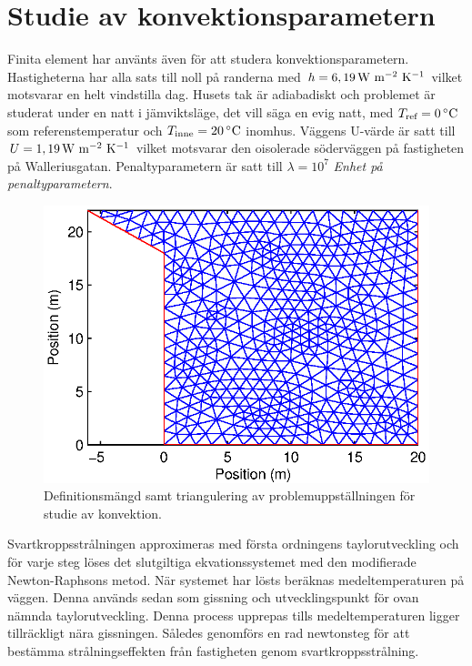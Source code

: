 \section{Studie av konvektionsparametern}

Finita element har använts även för att studera konvektionsparametern. Hastigheterna har alla
sats till noll på randerna med $h=\unit[6,19]{W~m^{-2}~K^{-1}}$ vilket motsvarar en helt vindstilla dag.
Husets tak är adiabadiskt
och problemet är studerat under en natt i jämviktsläge, det vill säga en evig natt, med
$T_\text{ref} = \unit[0]{^\circ C}$ som referenstemperatur och $T_\text{inne} = \unit[20]{^\circ C}$ inomhus.
Väggens U-värde är satt till $U = \unit[1,19]{W~m^{-2}~K^{-1}}$ vilket motsvarar den oisolerade söderväggen på fastigheten på Walleriusgatan. Penaltyparametern är satt till $\lambda = 10^7$ \emph{\color{red}Enhet på penaltyparametern}.

\begin{figure}
\centering
\includegraphics{images/triconvec.eps}
\caption{Definitionsmängd samt triangulering av problemuppställningen för studie av konvektion.}
\end{figure}

Svartkroppsstrålningen approximeras med första ordningens taylorutveckling och
för varje steg löses det slutgiltiga ekvationssystemet med den
modifierade Newton-Raphsons metod. När systemet har lösts beräknas
medeltemperaturen på väggen. Denna används sedan som gissning och utvecklingspunkt
för ovan nämnda taylorutveckling. Denna process upprepas tills medeltemperaturen
ligger tillräckligt nära gissningen. Således genomförs en rad newtonsteg
för att bestämma strålningseffekten från fastigheten genom svartkroppsstrålning.

